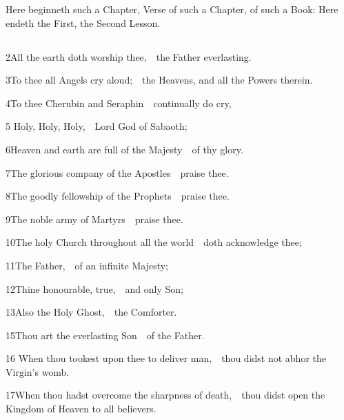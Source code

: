 Here beginneth such a Chapter,  Verse of such a Chapter, of such a Book:  Here endeth the First,  the Second Lesson.

\medskip


\subsection{}

2\enspace All the earth doth worship thee,\ \star\ the Father everlasting.

3\enspace To thee all Angels cry aloud;\ \star\ the Heavens, and all the Powers therein.

4\enspace To thee Cherubin and Seraphin\ \star\ continually do cry,

5 Holy, Holy, Holy,\ \star\ Lord God of Sabaoth;

6\enspace Heaven and earth are full of the Majesty\ \star\ of thy glory.

7\enspace The glorious company of the Apostles\ \star\ praise thee.

8\enspace The goodly fellowship of the Prophets\ \star\ praise thee.

9\enspace The noble army of Martyrs\ \star\ praise thee.

10\enspace The holy Church throughout all the world\ \star\ doth acknowledge thee;

11\enspace The Father,\ \star\ of an infinite Majesty;

12\enspace Thine honourable, true,\ \star\ and only Son;

13\enspace Also the Holy Ghost,\ \star\ the Comforter.



15\enspace Thou art the everlasting Son\ \star\ of the Father.

16 When thou tookest upon thee to deliver man,\ \star\ thou didst not abhor the Virgin’s womb.

17\enspace When thou hadst overcome the sharpness of death,\ \star\ thou didst open the Kingdom of Heaven to all believers.

